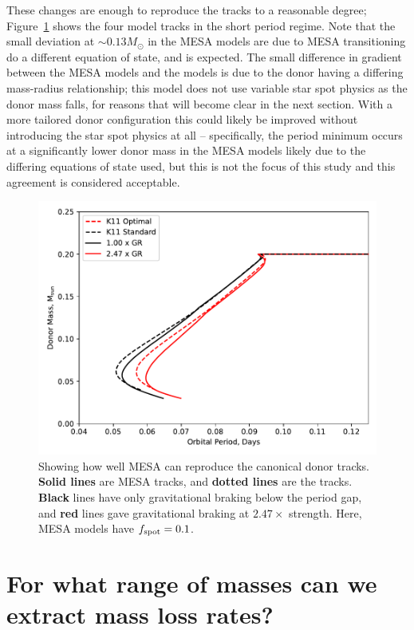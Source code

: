 These changes are enough to reproduce the \citet{knigge11} tracks to a reasonable degree; Figure~\ref{fig:results:MESA can reproduce the K11 tracks} shows the four model tracks in the short period regime.
Note that the small deviation at $\sim 0.13 M_\odot$ in the MESA models are due to MESA transitioning do a different equation of state, and is expected.
The small difference in gradient between the MESA models and the \citet{knigge11} models is due to the donor having a differing mass-radius relationship; this model does not use variable star spot physics as the donor mass falls, for reasons that will become clear in the next section.
With a more tailored donor configuration this could likely be improved without introducing the star spot physics at all -- specifically, the period minimum occurs at a significantly lower donor mass in the MESA models likely due to the differing equations of state used, but this is not the focus of this study and this agreement is considered acceptable.

\begin{figure}
    \centering
    \includegraphics[width=.9\textwidth]{figures/modelling/reproducing_K11_tracks_fspot0.100.pdf}
    \caption{Showing how well MESA can reproduce the canonical \citet{knigge11} donor tracks. {\bf Solid lines} are MESA tracks, and {\bf dotted lines} are the \citet{knigge11} tracks. {\bf Black} lines have only gravitational braking below the period gap, and {\bf red} lines gave gravitational braking at $2.47\times$ strength. Here, MESA models have $f_{\rm spot} = 0.1$.}
    \label{fig:results:MESA can reproduce the K11 tracks}
\end{figure}


\newpage
\section{For what range of masses can we extract mass loss rates?}
\label{sect:results:MESA massloss allowable mass range}

